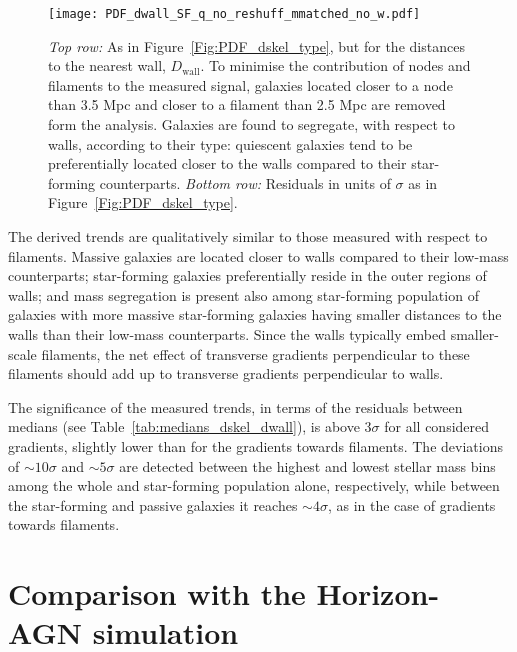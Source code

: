 \documentclass[useAMS,usenatbib]{mnras}
\begin{document}
\begin{figure}
\texttt{[image: PDF\_dwall\_SF\_q\_no\_reshuff\_mmatched\_no\_w.pdf]}
\caption{\textit{Top row:}  As in Figure~\ref{Fig:PDF_dskel_type}, but for the distances to the nearest wall, $D_{\mathrm{wall}}$.
To minimise the contribution of nodes and filaments to the measured signal, galaxies located closer to a node than 3.5 Mpc and closer to a filament than 2.5 Mpc are removed form the analysis. 
Galaxies are found to segregate, with respect to walls, according to their type: quiescent galaxies tend to be preferentially located closer to the walls compared to their star-forming counterparts.
\textit{Bottom row:} Residuals in units of $\sigma$ as in Figure~\ref{Fig:PDF_dskel_type}. 
}
\label{Fig:PDF_dwall_type}
\end{figure}


The derived trends are qualitatively similar to those measured with respect to  filaments. Massive galaxies are located closer to walls compared to their low-mass counterparts; star-forming galaxies preferentially reside in the outer regions of walls; and mass segregation is present also among star-forming population of galaxies with more massive star-forming galaxies having smaller distances to the walls than their low-mass counterparts.
Since the walls typically embed smaller-scale filaments, the net effect of transverse gradients perpendicular to these filaments should add up to transverse 
gradients perpendicular to walls.


The significance of the measured trends, in terms of the residuals between medians (see Table~\ref{tab:medians_dskel_dwall}), is above 3$\sigma$ for all considered gradients, slightly lower than for the gradients towards filaments. The deviations of $\sim 10 \sigma$ and $\sim 5 \sigma$ are detected between the highest and lowest stellar mass bins among the whole and star-forming population alone, respectively, while between the star-forming and passive galaxies it reaches $\sim 4 \sigma$, as in the case of gradients towards filaments.

\section{Comparison with the Horizon-AGN simulation}
\label{sec:hagn}
 
\end{document}
